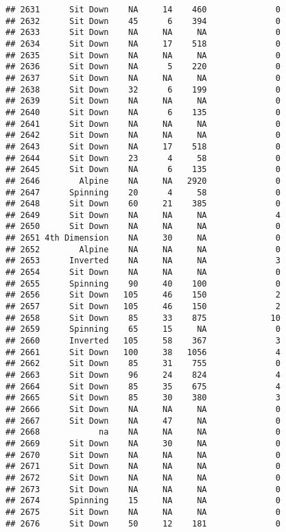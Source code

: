 \documentclass[
]{article}
\begin{document}
\begin{verbatim}
## 2631      Sit Down    NA     14    460              0
## 2632      Sit Down    45      6    394              0
## 2633      Sit Down    NA     NA     NA              0
## 2634      Sit Down    NA     17    518              0
## 2635      Sit Down    NA     NA     NA              0
## 2636      Sit Down    NA      5    220              0
## 2637      Sit Down    NA     NA     NA              0
## 2638      Sit Down    32      6    199              0
## 2639      Sit Down    NA     NA     NA              0
## 2640      Sit Down    NA      6    135              0
## 2641      Sit Down    NA     NA     NA              0
## 2642      Sit Down    NA     NA     NA              0
## 2643      Sit Down    NA     17    518              0
## 2644      Sit Down    23      4     58              0
## 2645      Sit Down    NA      6    135              0
## 2646        Alpine    NA     NA   2920              0
## 2647      Spinning    20      4     58              0
## 2648      Sit Down    60     21    385              0
## 2649      Sit Down    NA     NA     NA              4
## 2650      Sit Down    NA     NA     NA              0
## 2651 4th Dimension    NA     30     NA              0
## 2652        Alpine    NA     NA     NA              0
## 2653      Inverted    NA     NA     NA              3
## 2654      Sit Down    NA     NA     NA              0
## 2655      Spinning    90     40    100              0
## 2656      Sit Down   105     46    150              2
## 2657      Sit Down   105     46    150              2
## 2658      Sit Down    85     33    875             10
## 2659      Spinning    65     15     NA              0
## 2660      Inverted   105     58    367              3
## 2661      Sit Down   100     38   1056              4
## 2662      Sit Down    85     31    755              0
## 2663      Sit Down    96     24    824              4
## 2664      Sit Down    85     35    675              4
## 2665      Sit Down    85     30    380              3
## 2666      Sit Down    NA     NA     NA              0
## 2667      Sit Down    NA     47     NA              0
## 2668            na    NA     NA     NA              0
## 2669      Sit Down    NA     30     NA              0
## 2670      Sit Down    NA     NA     NA              0
## 2671      Sit Down    NA     NA     NA              0
## 2672      Sit Down    NA     NA     NA              0
## 2673      Sit Down    NA     NA     NA              0
## 2674      Spinning    15     NA     NA              0
## 2675      Sit Down    NA     NA     NA              0
## 2676      Sit Down    50     12    181              0

\end{verbatim}
\end{document}

